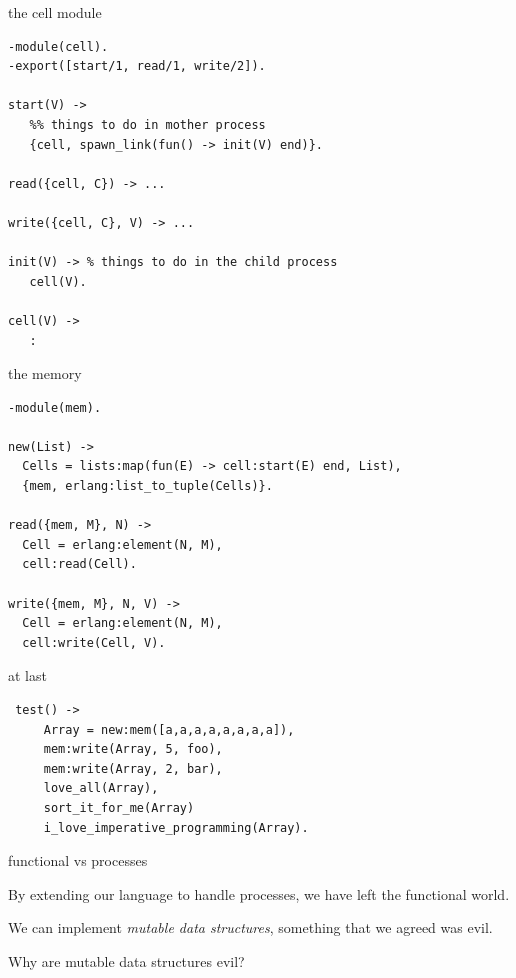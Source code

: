 \begin{frame}[fragile]{the cell module}
\begin{verbatim}
-module(cell).
-export([start/1, read/1, write/2]).

start(V) ->
   %% things to do in mother process
   {cell, spawn_link(fun() -> init(V) end)}.

read({cell, C}) -> ...

write({cell, C}, V) -> ...

init(V) -> % things to do in the child process
   cell(V).     

cell(V) ->
   :
\end{verbatim}
\end{frame}

\begin{frame}[fragile]{the memory}

\begin{verbatim}
-module(mem).

new(List) -> 
  Cells = lists:map(fun(E) -> cell:start(E) end, List),
  {mem, erlang:list_to_tuple(Cells)}.

read({mem, M}, N) ->
  Cell = erlang:element(N, M),
  cell:read(Cell).

write({mem, M}, N, V) ->
  Cell = erlang:element(N, M),
  cell:write(Cell, V).
\end{verbatim}
\end{frame}

\begin{frame}[fragile]{at last}

\pause
\begin{verbatim}
 test() -> 
     Array = new:mem([a,a,a,a,a,a,a,a]),
     mem:write(Array, 5, foo),
     mem:write(Array, 2, bar),
     love_all(Array),
     sort_it_for_me(Array)
     i_love_imperative_programming(Array).
\end{verbatim}
\end{frame}

\begin{frame}{functional vs processes}

By extending our language to handle processes, we have left the
functional world. 

\pause\vspace{10pt}
We can implement {\em mutable data structures}, something
that we agreed was evil.

\pause\vspace{20pt}

Why are mutable data structures evil?

\end{frame}


